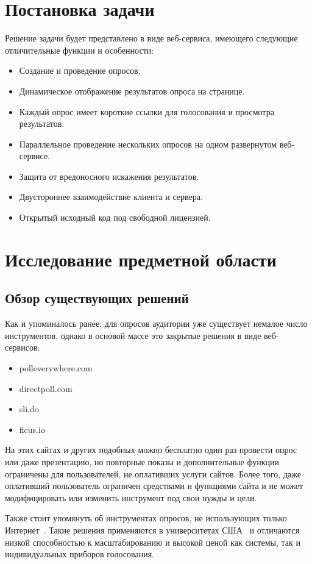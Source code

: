 \section{Постановка задачи}
Решение задачи будет представлено в виде веб-сервиса, имеющего следующие отличительные функции и особенности:
\begin{itemize}
	\item Создание и проведение опросов. 
	\item Динамическое отображение результатов опроса на странице.
	\item Каждый опрос имеет короткие ссылки для голосования и просмотра результатов.
	\item Параллельное проведение нескольких опросов на одном развернутом веб-сервисе.
	\item Защита от вредоносного искажения результатов. 
	\item Двустороннее взаимодействие клиента и сервера.
	\item Открытый исходный код под свободной лицензией.
\end{itemize} 


\section{Исследование предметной области}
\subsection{Обзор существующих решений}
Как и упоминалось ранее, для опросов аудитории уже существует немалое число инструментов, однако в основой массе это закрытые решения в виде веб-сервисов:
\begin{itemize}
	\item polleverywhere.com
	\item directpoll.com
	\item sli.do
	\item ficus.io
\end{itemize}
На этих сайтах и других подобных можно бесплатно один раз провести опрос или даже презентацию, но повторные показы и дополнительные функции ограничены для пользователей, не оплативших услуги сайтов. Более того, даже оплативший пользователь ограничен средствами и функциями сайта и не может модифицировать или изменить инструмент под свои нужды и цели.

Также стоит упомянуть об инструментах опросов, не использующих только Интернет~\autocite{ombea}. Такие решения применяются в университетах США~\autocite{nea} и отличаются низкой способностью к масштабированию и высокой ценой как системы, так и индивидуальных приборов голосования.

